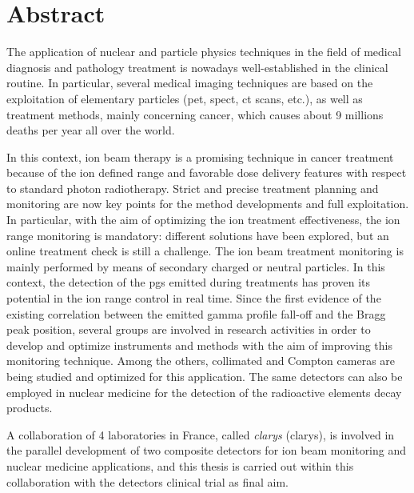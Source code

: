 \chapter*{Abstract}

\glsresetall


The application of nuclear and particle physics techniques in the field of medical diagnosis and pathology treatment is nowadays well-established in the clinical routine. In particular, several medical imaging techniques are based on the exploitation of elementary particles (\gls{pet}, \gls{spect}, \gls{ct} scans,  etc.), as well as treatment methods, mainly concerning cancer, which causes about 9 millions deaths per year all over the world.
     
In this context, ion beam therapy is a promising technique in cancer treatment because of the ion defined range and favorable dose delivery features with respect to standard photon radiotherapy. Strict and precise treatment planning and monitoring are now key points for the method developments and full exploitation. In particular, with the aim of optimizing the ion treatment effectiveness, the ion range monitoring is mandatory: different solutions have been explored, but an online treatment check is still a challenge. 
The ion beam treatment monitoring is mainly performed by means of secondary charged or neutral particles. In this context, the detection of the \glspl{pg} emitted during treatments has proven its potential in the ion range control in real time. Since the first evidence of the existing correlation between the emitted gamma profile fall-off and the Bragg peak position, several groups are involved in research activities in order to develop and optimize instruments and methods with the aim of improving this monitoring technique.  Among the others, collimated and Compton cameras are being studied and optimized for this application. The same detectors can also be employed in nuclear medicine for the detection of the radioactive elements decay products.      

A collaboration of 4 laboratories in France, called \textit{\glsdesc{clarys}} (\acrshort{clarys}), is involved in the parallel development of two composite detectors for ion beam monitoring and nuclear medicine applications, and this thesis is carried out within this collaboration with the detectors clinical trial as final aim.

